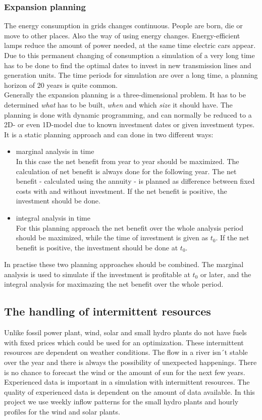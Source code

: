 \documentclass{article}
\begin{document}
\subsubsection{Expansion planning}
The energy consumption in grids changes continuous. People are born, die or move to other places. Also the way of using energy changes. Energy-efficient lamps reduce the amount of power needed, at the same time electric cars appear. Due to this permanent changing of consumption a simulation of a very long time has to be done to find the optimal dates to invest in new transmission lines and generation units. The time periods for simulation are over a long time, a planning horizon of 20 years is quite common.\\
Generally the expansion planning is a three-dimensional problem. It has to be determined \textit{what} has to be built, \textit{when} and which \textit{size} it should have. The planning is done with dynamic programming, and can normally be reduced to a 2D- or even 1D-model due to known investment dates or given investment types. It is a static planning approach and can done in two different ways:
\begin{itemize}
\item marginal analysis in time\\
In this case the net benefit from year to year should be maximized. The calculation of net benefit is always done for the following year. The net benefit - calculated using the annuity - is planned as difference between fixed costs with and without investment. If the net benefit is positive, the investment should be done.
\item integral analysis in time\\
For this planning approach the net benefit over the whole analysis period should be maximized, while the time of investment is given as $t_0$. If the net benefit is positive, the investment should be done at $t_0$.
\end{itemize}
In practise these two planning approaches should be combined. The marginal analysis is used to simulate if the investment is profitable at $t_0$ or later, and the integral analysis for maximazing the net benefit over the whole period.
\subsection{The handling of intermittent resources}
Unlike fossil power plant, wind, solar and small hydro plants do not have fuels with fixed prices which could be used for an optimization. These intermittent resources are dependent on weather conditions. The flow in a river isn´t stable over the year and there is always the possibility of unexpected happenings. There is no chance to forecast the wind or the amount of sun for the next few years. Experienced data is important in a simulation with intermittent resources. The quality of experienced data is dependent on the amount of data available. In this project we use weekly inflow patterns for the small hydro plants and hourly profiles for the wind and solar plants. 
\end{document}

